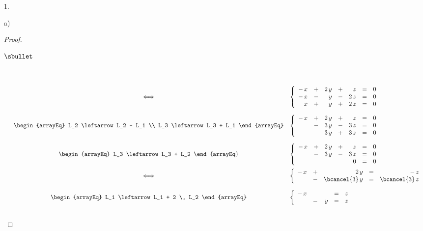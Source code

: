 \documentclass[11pt]{article}%
\begin{document}
\begin{noliste}{1.}
\begin{noliste}{a)}
\begin{proof}
\begin{noliste}{$\sbullet$}
\[\begin{array}{rcl}
          \\[.8cm]
          & \Longleftrightarrow &
          \left\{
	    \begin{array}{rcrcrcr}
	      - \, x & + & 2 \, y & + & z & = & 0 \\
	      - \, x & - & y & - & 2 \, z & = & 0 \\
	      x & + & y & + & 2 \, z & = & 0 
	    \end{array}
          \right.
          \\[.8cm]
          & 
          \begin{arrayEq}
            L_2 \leftarrow L_2 - L_1 \\
            L_3 \leftarrow L_3 + L_1 
          \end{arrayEq}
          &
          \left\{
	    \begin{array}{rcrcrcr}
	      - \, x & + & 2 \, y & + & z & = & 0 \\
              & - & 3 \, y & - & 3 \, z & = & 0 \\
              & & 3 \, y & + & 3 \, z & = & 0 
	    \end{array}
          \right.
          \\[.8cm]
          & 
          \begin{arrayEq}
            L_3 \leftarrow L_3 + L_2
          \end{arrayEq}
          &
          \left\{
	    \begin{array}{rcrcrcr}
	      - \, x & + & 2 \, y & + & z & = & 0 \\
              & - & 3 \, y & - & 3 \, z & = & 0 \\
              & & & & 0 & = & 0 
	    \end{array}
          \right.
          \\[.6cm]
          & 
          \Longleftrightarrow
          &
          \left\{
	    \begin{array}{rcrcr}
	      - \, x & + & 2 \, y & = & - \, z \\
              & - & \bcancel{3} \, y & = & \bcancel{3} \, z 
	    \end{array}
          \right.
          \\[.6cm]
          & 
          \begin{arrayEq}
            L_1 \leftarrow L_1 + 2 \, L_2
          \end{arrayEq}
          &
          \left\{
	    \begin{array}{rcrcr}
	      - \, x & & & = & z \\
              & - & \, y & = & z 
	    \end{array}
          \right.
          \\[.6cm]
        \end{array}
	\]
	

\end{noliste}
\end{proof}
\end{noliste}
\end{noliste}
\end{document}
